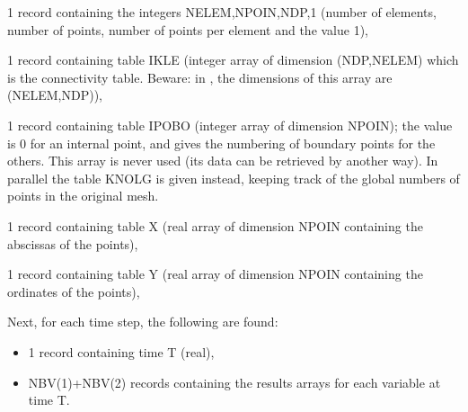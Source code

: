 1 record containing the integers NELEM,NPOIN,NDP,1 (number of elements, number
of points, number of points per element and the value 1),

1 record containing table IKLE (integer array of dimension (NDP,NELEM) which is
the connectivity table. Beware: in , the dimensions of this array
are (NELEM,NDP)),

1 record containing table IPOBO (integer array of dimension NPOIN); the value
is 0 for an internal point, and gives the numbering of boundary points for the
others. This array is never used (its data can be retrieved by another way). In
parallel the table KNOLG is given instead, keeping track of the global numbers
of points in the original mesh.

1 record containing table X (real array of dimension NPOIN containing the
abscissas of the points),

1 record containing table Y (real array of dimension NPOIN containing the
ordinates of the points),

Next, for each time step, the following are found:
\begin{itemize}
  \item 1 record containing time T (real),
  \item NBV(1)+NBV(2) records containing the results arrays for each variable
    at time T.
\end{itemize}

